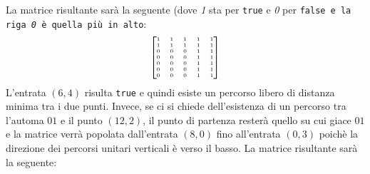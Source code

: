 \documentclass[a4paper,11pt]{article}
\begin{document}
\begin{center}
    
\end{center}
La matrice risultante sarà la seguente (dove \textit{1} sta per \texttt{true} e \textit{0} per \texttt{false e la riga \textit{0} è quella più in alto}:
\[
\tiny
\begin{bmatrix}
1 & 1 & 1 & 1 & 1 \\
1 & 1 & 1 & 1 & 1 \\
0 & 0 & 0 & 1 & 1 \\
0 & 0 & 0 & 1 & 1 \\
0 & 0 & 0 & 1 & 1 \\
0 & 0 & 0 & 1 & 1 \\
0 & 0 & 0 & 1 & 1 \\
\end{bmatrix}
\]
L'entrata $(6, 4)$ risulta \texttt{true} e quindi esiste un percorso libero di distanza minima tra i due punti. Invece, se ci si chiede dell'esistenza di un percorso tra l'automa $01$ e il punto $(12, 2)$, il punto di partenza resterà quello su cui giace $01$ e la matrice verrà popolata dall'entrata $(8, 0)$ fino all'entrata $(0, 3)$ poichè la direzione dei percorsi unitari verticali è verso il basso. La matrice risultante sarà la seguente:
\end{document}
